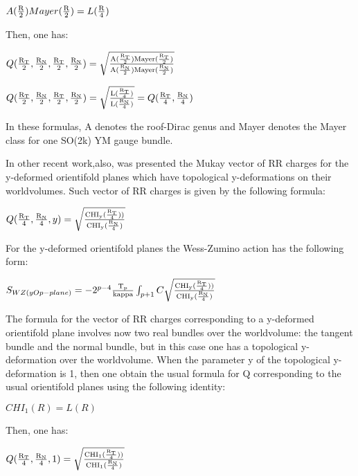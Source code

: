 \documentclass[a4paper,a4paper]{article}
\begin{document}
\begin{center}
 
{  $A(\frac{\rm R}{\rm 2})Mayer(\frac{\rm R}{\rm 2}) 
 = L(\frac{\rm R}{\rm 4})$}
\end{center} 

Then, one has:

\begin{center}
{  $ Q(\frac{\rm R_T}{\rm 2},\frac{\rm R_N}{\rm 2},\frac{\rm R_T}{\rm 2},\frac{\rm R_N}{\rm 2}) =\sqrt{\frac{\rm A(\frac{\rm R_T}{\rm 2})Mayer(\frac{\rm R_T}{\rm 2})}{\rm A(\frac{\rm R_N}{\rm 2})Mayer(\frac{\rm R_N}{\rm 2})}} $ }
\end{center}

\begin{center}
{  $ Q(\frac{\rm R_T}{\rm 2},\frac{\rm R_N}{\rm 2},\frac{\rm R_T}{\rm 2},\frac{\rm R_N}{\rm 2}) =\sqrt{\frac{\rm L(\frac{\rm R_T}{\rm 4})}{\rm L(\frac{\rm R_N}{\rm 4})}}=Q(\frac{\rm R_T}{\rm 4},\frac{\rm R_N}{\rm 4}) $ }
\end{center}

In these formulas, A denotes the roof-Dirac genus and Mayer denotes the Mayer class for one SO(2k) YM gauge bundle.

In other recent work,also, was presented the Mukay vector of RR charges for the y-deformed  orientifold planes which have topological y-deformations on their worldvolumes.  Such vector of RR charges is given by the following formula:

\begin{center}
{  $ Q(\frac{\rm R_T}{\rm 4},\frac{\rm R_N}{\rm 4},y) =\sqrt{\frac{\rm CHI_y(\frac{\rm R_T}{\rm 4}) )}{\rm CHI_y(\frac{\rm R_N}{\rm 4})}} $ }
\end{center}

For the y-deformed  orientifold planes the Wess-Zumino action has the following form:

\begin{center}
{  $ S_{WZ(yOp-plane)} = -2^{p-4}\frac{\rm T_p}{\rm kappa}\int_{p+1} C\sqrt{\frac{\rm CHI_y(\frac{\rm R_T}{\rm 4}) )}{\rm CHI_y(\frac{\rm R_N}{\rm 4})}}$ }
\end{center}
The formula for the vector of RR charges corresponding to a y-deformed orientifold plane involves now two real bundles over the worldvolume: the 
tangent bundle and  the normal bundle, but in this case one has a topological y-deformation over the worldvolume.
When the parameter y of the topological y-deformation is 1, then one obtain the usual formula for Q corresponding to the usual orientifold planes using the following identity:
\begin{center}
 
{  $ 
 CHI_1(R)= L(R)$}
\end{center} 
Then, one has:
\begin{center}
{  $ Q(\frac{\rm R_T}{\rm 4},\frac{\rm R_N}{\rm 4},1) = \sqrt{\frac{\rm CHI_1(\frac{\rm R_T}{\rm 4}) )}{\rm CHI_1(\frac{\rm R_N}{\rm 4})}}$ }
\end{center}
\end{document}

